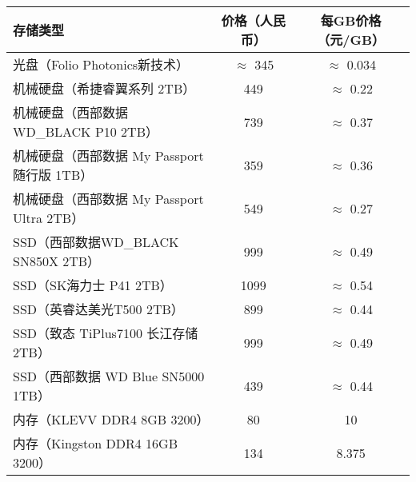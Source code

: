 \documentclass[UTF8]{report}
\begin{document}
\begin{tabular}{|l|c|c|}
    \hline
    \textbf{存储类型} & \textbf{价格（人民币）} & \textbf{每GB价格（元/GB）} \\
    \hline
    光盘（Folio Photonics新技术） & $\approx$ 345 & $\approx$ 0.034 \\
    \hline
    机械硬盘（希捷睿翼系列 2TB） & 449 & $\approx$ 0.22 \\
    \hline
    机械硬盘（西部数据 WD\_BLACK P10 2TB） & 739 & $\approx$ 0.37 \\
    \hline
    机械硬盘（西部数据 My Passport随行版 1TB） & 359 & $\approx$ 0.36 \\
    \hline
    机械硬盘（西部数据 My Passport Ultra 2TB） & 549 & $\approx$ 0.27 \\
    \hline
    SSD（西部数据WD_BLACK SN850X 2TB） & 999 & $\approx$ 0.49 \\
    \hline
    SSD（SK海力士 P41 2TB） & 1099 & $\approx$ 0.54 \\
    \hline
    SSD（英睿达美光T500 2TB） & 899 & $\approx$ 0.44 \\
    \hline
    SSD（致态 TiPlus7100 长江存储 2TB） & 999 & $\approx$ 0.49 \\
    \hline
    SSD（西部数据 WD Blue SN5000 1TB） & 439 & $\approx$ 0.44 \\
    \hline
    内存（KLEVV DDR4 8GB 3200） & 80 & 10 \\
    \hline
    内存（Kingston DDR4 16GB 3200） & 134 & 8.375 \\
    \hline
\end{tabular}
\end{document}
